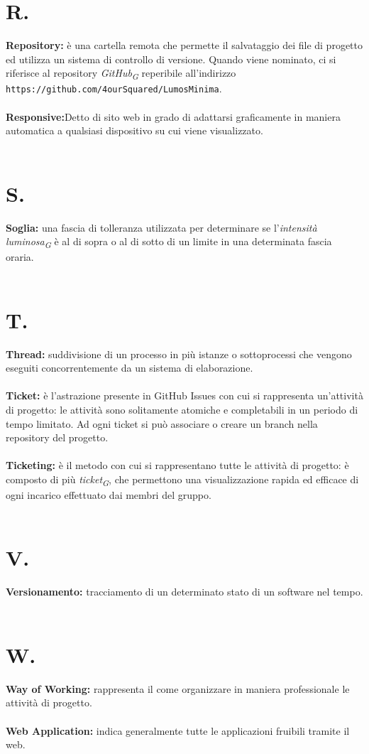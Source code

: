 \documentclass[a4paper, 12pt]{article}
\begin{document}
\section{R.}
\textbf{Repository:} è una cartella remota che permette il salvataggio dei file
di progetto ed utilizza un sistema di controllo di versione. Quando
viene nominato, ci si riferisce al repository \textit{GitHub\textsubscript{G}} reperibile all’indirizzo \texttt{https://github.com/4ourSquared/LumosMinima}.  \\ \\
\textbf{Responsive:}Detto di sito web in grado di adattarsi graficamente in maniera automatica a qualsiasi dispositivo su cui viene visualizzato. \\ \\

\newpage
\section{S.}
\textbf{Soglia:} una fascia di tolleranza utilizzata per determinare se l'\textit{intensità luminosa\textsubscript{G}} è al di sopra o al di sotto di un limite in una determinata fascia oraria. \\ \\

\newpage
\section{T.}
\textbf{Thread:} suddivisione di un processo in più istanze o sottoprocessi che vengono eseguiti concorrentemente da un sistema di elaborazione. \\ \\
\textbf{Ticket:} è l'astrazione presente in GitHub Issues con cui si rappresenta
un'attività di progetto: le attività sono solitamente atomiche e completabili in
un periodo di tempo limitato. Ad ogni ticket si può associare o creare un branch
nella repository del progetto.\\ \\
\textbf{Ticketing:} è il metodo con cui si rappresentano tutte le attività di
progetto: è composto di più \textit{ticket\textsubscript{G}}, che permettono una visualizzazione rapida ed
efficace di ogni incarico effettuato dai membri del gruppo. \\ \\
\newpage
\section{V.}
\textbf{Versionamento:} tracciamento di un determinato stato di un software nel tempo. \\ \\

\newpage
\section{W.}
\textbf{Way of Working:} rappresenta il come organizzare in maniera professionale le attività di progetto.\\ \\
\textbf{Web Application:} indica generalmente tutte le applicazioni fruibili tramite il web.
\end{document}
